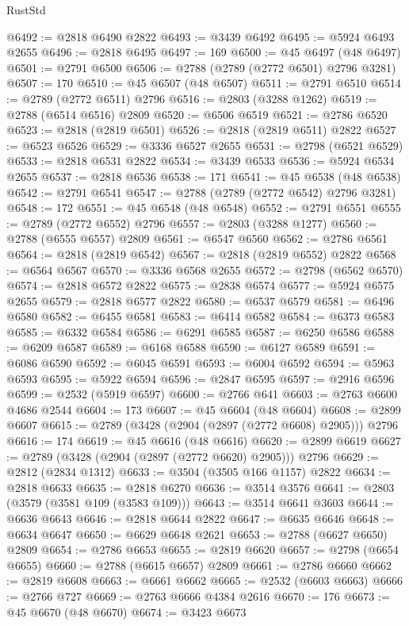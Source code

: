 \begin{lexlean}{RustStd}
\begin{coremodule}
@6492 := @2818 @6490 @2822
@6493 := @3439 @6492
@6495 := @5924 @6493 @2655
@6496 := @2818 @6495
@6497 := 169
@6500 := @45 @6497 (@48 @6497)
@6501 := @2791 @6500
@6506 := @2788 (@2789 (@2772 @6501) @2796 @3281)
@6507 := 170
@6510 := @45 @6507 (@48 @6507)
@6511 := @2791 @6510
@6514 := @2789 (@2772 @6511) @2796
@6516 := @2803 (@3288 @1262)
@6519 := @2788 (@6514 @6516) @2809
@6520 := @6506 @6519
@6521 := @2786 @6520
@6523 := @2818 (@2819 @6501)
@6526 := @2818 (@2819 @6511) @2822
@6527 := @6523 @6526
@6529 := @3336 @6527 @2655
@6531 := @2798 (@6521 @6529)
@6533 := @2818 @6531 @2822
@6534 := @3439 @6533
@6536 := @5924 @6534 @2655
@6537 := @2818 @6536
@6538 := 171
@6541 := @45 @6538 (@48 @6538)
@6542 := @2791 @6541
@6547 := @2788 (@2789 (@2772 @6542) @2796 @3281)
@6548 := 172
@6551 := @45 @6548 (@48 @6548)
@6552 := @2791 @6551
@6555 := @2789 (@2772 @6552) @2796
@6557 := @2803 (@3288 @1277)
@6560 := @2788 (@6555 @6557) @2809
@6561 := @6547 @6560
@6562 := @2786 @6561
@6564 := @2818 (@2819 @6542)
@6567 := @2818 (@2819 @6552) @2822
@6568 := @6564 @6567
@6570 := @3336 @6568 @2655
@6572 := @2798 (@6562 @6570)
@6574 := @2818 @6572 @2822
@6575 := @2838 @6574
@6577 := @5924 @6575 @2655
@6579 := @2818 @6577 @2822
@6580 := @6537 @6579
@6581 := @6496 @6580
@6582 := @6455 @6581
@6583 := @6414 @6582
@6584 := @6373 @6583
@6585 := @6332 @6584
@6586 := @6291 @6585
@6587 := @6250 @6586
@6588 := @6209 @6587
@6589 := @6168 @6588
@6590 := @6127 @6589
@6591 := @6086 @6590
@6592 := @6045 @6591
@6593 := @6004 @6592
@6594 := @5963 @6593
@6595 := @5922 @6594
@6596 := @2847 @6595
@6597 := @2916 @6596
@6599 := @2532 (@5919 @6597)
@6600 := @2766 @641
@6603 := @2763 @6600 @4686 @2544
@6604 := 173
@6607 := @45 @6604 (@48 @6604)
@6608 := @2899 @6607
@6615 := @2789 (@3428 (@2904 (@2897 (@2772 @6608) @2905))) @2796
@6616 := 174
@6619 := @45 @6616 (@48 @6616)
@6620 := @2899 @6619
@6627 := @2789 (@3428 (@2904 (@2897 (@2772 @6620) @2905))) @2796
@6629 := @2812 (@2834 @1312)
@6633 := @3504 (@3505 @166 @1157) @2822
@6634 := @2818 @6633
@6635 := @2818 @6270
@6636 := @3514 @3576
@6641 := @2803 (@3579 (@3581 @109 (@3583 @109)))
@6643 := @3514 @6641 @3603
@6644 := @6636 @6643
@6646 := @2818 @6644 @2822
@6647 := @6635 @6646
@6648 := @6634 @6647
@6650 := @6629 @6648 @2621
@6653 := @2788 (@6627 @6650) @2809
@6654 := @2786 @6653
@6655 := @2819 @6620
@6657 := @2798 (@6654 @6655)
@6660 := @2788 (@6615 @6657) @2809
@6661 := @2786 @6660
@6662 := @2819 @6608
@6663 := @6661 @6662
@6665 := @2532 (@6603 @6663)
@6666 := @2766 @727
@6669 := @2763 @6666 @4384 @2616
@6670 := 176
@6673 := @45 @6670 (@48 @6670)
@6674 := @3423 @6673

\end{coremodule}
\end{lexlean}
